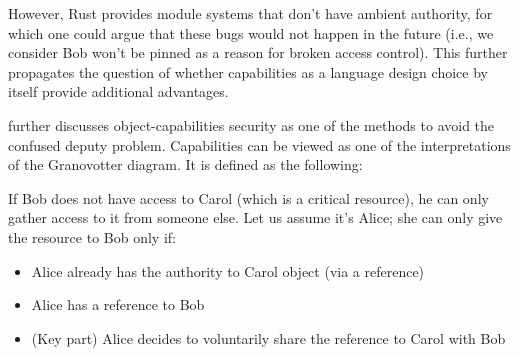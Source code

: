 However, Rust provides module systems that don't have ambient authority, for which one could argue that these bugs would not happen in the future (i.e., we consider Bob won't be pinned as a reason for broken access control). This further propagates the question of whether capabilities as a language design choice by itself provide additional advantages.

\cite{millerCapRights} further discusses object-capabilities security as one of the methods to avoid the confused deputy problem. Capabilities can be viewed as one of the interpretations of the Granovotter diagram. It is defined as the following:

If Bob does not have access to Carol (which is a critical resource), he can only gather access to it from someone else. Let us assume it's Alice; she can only give the resource to Bob only if:
\begin{itemize}
    \item Alice already has the authority to Carol object (via a reference)
    \item Alice has a reference to Bob
    \item (Key part) Alice decides to voluntarily share the reference to Carol with Bob
\end{itemize}





